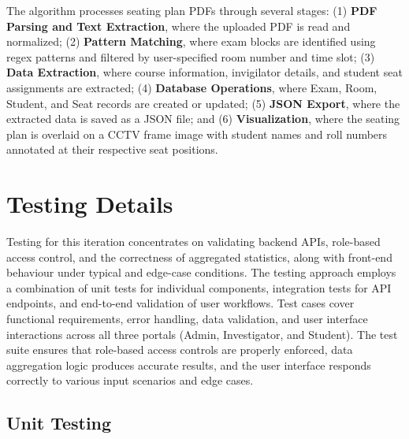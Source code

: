 The algorithm processes seating plan PDFs through several stages: (1) \textbf{PDF Parsing and Text Extraction}, where the uploaded PDF is read and normalized; (2) \textbf{Pattern Matching}, where exam blocks are identified using regex patterns and filtered by user-specified room number and time slot; (3) \textbf{Data Extraction}, where course information, invigilator details, and student seat assignments are extracted; (4) \textbf{Database Operations}, where Exam, Room, Student, and Seat records are created or updated; (5) \textbf{JSON Export}, where the extracted data is saved as a JSON file; and (6) \textbf{Visualization}, where the seating plan is overlaid on a CCTV frame image with student names and roll numbers annotated at their respective seat positions.
\section{Testing Details}
Testing for this iteration concentrates on validating backend APIs, role-based access control, and the correctness of aggregated statistics, along with front-end behaviour under typical and edge-case conditions. The testing approach employs a combination of unit tests for individual components, integration tests for API endpoints, and end-to-end validation of user workflows. Test cases cover functional requirements, error handling, data validation, and user interface interactions across all three portals (Admin, Investigator, and Student). The test suite ensures that role-based access controls are properly enforced, data aggregation logic produces accurate results, and the user interface responds correctly to various input scenarios and edge cases.
\subsection{Unit Testing}
